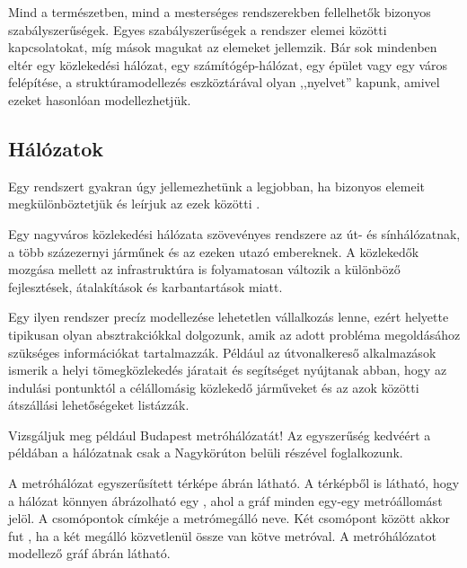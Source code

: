 Mind a természetben, mind a mesterséges rendszerekben fellelhetők bizonyos szabályszerűségek. Egyes szabályszerűségek a rendszer elemei közötti kapcsolatokat, míg mások magukat az elemeket jellemzik. Bár sok mindenben eltér egy közlekedési hálózat, egy számítógép-hálózat, egy épület vagy egy város felépítése, a struktúramodellezés eszköztárával olyan ,,nyelvet'' kapunk, amivel ezeket hasonlóan modellezhetjük.

\subsection{Hálózatok}
\label{sec:halozatok}

Egy rendszert gyakran úgy jellemezhetünk a legjobban, ha bizonyos elemeit megkülönböztetjük és leírjuk az ezek közötti .

\begin{pelda}
	Egy nagyváros közlekedési hálózata szövevényes rendszere az út- és sínhálózatnak, a több százezernyi járműnek és az ezeken utazó embereknek. A közlekedők mozgása mellett az infrastruktúra is folyamatosan változik a különböző fejlesztések, átalakítások és karbantartások miatt.
	
	Egy ilyen rendszer precíz modellezése lehetetlen vállalkozás lenne, ezért helyette tipikusan olyan absztrakciókkal dolgozunk, amik az adott probléma megoldásához szükséges információkat tartalmazzák. Például az útvonalkereső alkalmazások ismerik a helyi tömegközlekedés járatait és segítséget nyújtanak abban, hogy az indulási pontunktól a célállomásig közlekedő járműveket és az azok közötti átszállási lehetőségeket listázzák.
	
	Vizsgáljuk meg például Budapest metróhálózatát! Az egyszerűség kedvéért a példában a hálózatnak csak a Nagykörúton belüli részével foglalkozunk.
\end{pelda}

A metróhálózat egyszerűsített térképe  ábrán látható. A térképből is látható, hogy a hálózat könnyen ábrázolható egy , ahol a gráf minden  egy-egy metróállomást jelöl. A csomópontok címkéje a metrómegálló neve. Két csomópont között akkor fut , ha a két megálló közvetlenül össze van kötve metróval. A metróhálózatot modellező %
gráf  ábrán látható.

